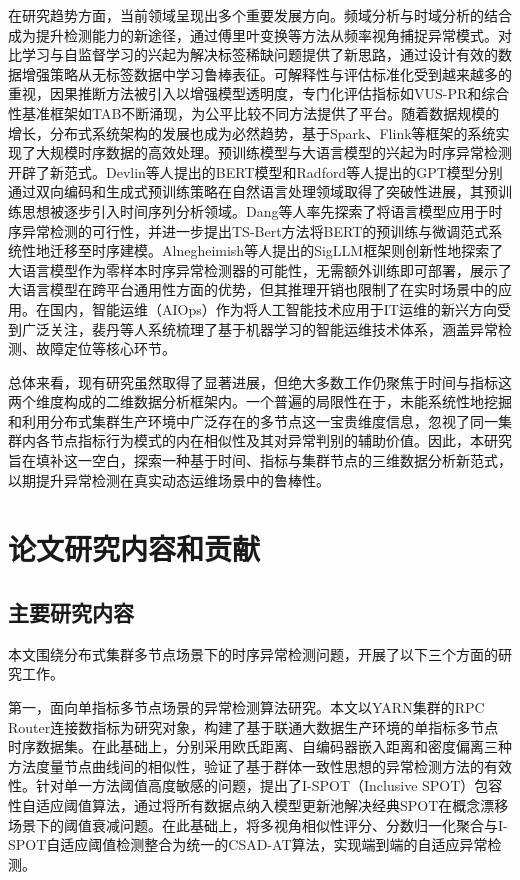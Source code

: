 在研究趋势方面，当前领域呈现出多个重要发展方向。频域分析与时域分析的结合成为提升检测能力的新途径\cite{ren2019srnn}，通过傅里叶变换等方法从频率视角捕捉异常模式。对比学习与自监督学习的兴起为解决标签稀缺问题提供了新思路\cite{darban2025carla}，通过设计有效的数据增强策略从无标签数据中学习鲁棒表征。可解释性与评估标准化受到越来越多的重视，因果推断方法被引入以增强模型透明度，专门化评估指标如VUS-PR\cite{paparrizos2022tsbuad}和综合性基准框架如TAB\cite{wu2024tab}不断涌现，为公平比较不同方法提供了平台。随着数据规模的增长，分布式系统架构的发展也成为必然趋势，基于Spark\cite{fan2015spark}、Flink\cite{carbone2015flink}等框架的系统实现了大规模时序数据的高效处理。预训练模型与大语言模型的兴起为时序异常检测开辟了新范式。Devlin等人\cite{devlin2018bert}提出的BERT模型和Radford等人\cite{radford2018gpt}提出的GPT模型分别通过双向编码和生成式预训练策略在自然语言处理领域取得了突破性进展，其预训练思想被逐步引入时间序列分析领域。Dang等人\cite{dang2020tsad}率先探索了将语言模型应用于时序异常检测的可行性，并进一步提出TS-Bert方法\cite{dang2021tsbert}将BERT的预训练与微调范式系统性地迁移至时序建模。Alnegheimish等人\cite{alnegheimish2024sigllm}提出的SigLLM框架则创新性地探索了大语言模型作为零样本时序异常检测器的可能性，无需额外训练即可部署，展示了大语言模型在跨平台通用性方面的优势，但其推理开销也限制了在实时场景中的应用。在国内，智能运维（AIOps）作为将人工智能技术应用于IT运维的新兴方向受到广泛关注，裴丹等人\cite{pei2017mlops}系统梳理了基于机器学习的智能运维技术体系，涵盖异常检测、故障定位等核心环节。

总体来看，现有研究虽然取得了显著进展，但绝大多数工作仍聚焦于时间与指标这两个维度构成的二维数据分析框架内。一个普遍的局限性在于，未能系统性地挖掘和利用分布式集群生产环境中广泛存在的多节点这一宝贵维度信息，忽视了同一集群内各节点指标行为模式的内在相似性及其对异常判别的辅助价值。因此，本研究旨在填补这一空白，探索一种基于时间、指标与集群节点的三维数据分析新范式，以期提升异常检测在真实动态运维场景中的鲁棒性。

\section{论文研究内容和贡献}

\subsection{主要研究内容}

本文围绕分布式集群多节点场景下的时序异常检测问题，开展了以下三个方面的研究工作。

第一，面向单指标多节点场景的异常检测算法研究。本文以YARN集群的RPC Router连接数指标为研究对象，构建了基于联通大数据生产环境的单指标多节点时序数据集。在此基础上，分别采用欧氏距离、自编码器嵌入距离和密度偏离三种方法度量节点曲线间的相似性，验证了基于群体一致性思想的异常检测方法的有效性。针对单一方法阈值高度敏感的问题，提出了I-SPOT（Inclusive SPOT）包容性自适应阈值算法，通过将所有数据点纳入模型更新池解决经典SPOT在概念漂移场景下的阈值衰减问题。在此基础上，将多视角相似性评分、分数归一化聚合与I-SPOT自适应阈值检测整合为统一的CSAD-AT算法，实现端到端的自适应异常检测。

